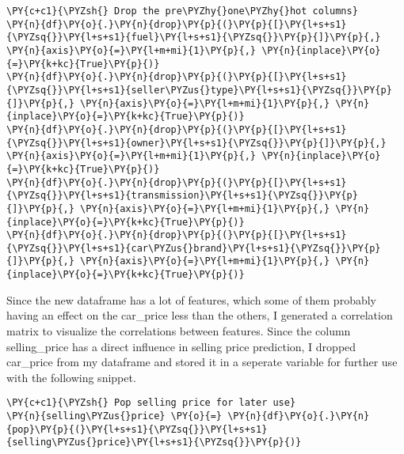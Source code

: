 \begin{tcolorbox}[breakable, size=fbox, boxrule=1pt, pad at break*=1mm,colback=cellbackground, colframe=cellborder]
\begin{Verbatim}[commandchars=\\\{\}]
\PY{c+c1}{\PYZsh{} Drop the pre\PYZhy{}one\PYZhy{}hot columns}
\PY{n}{df}\PY{o}{.}\PY{n}{drop}\PY{p}{(}\PY{p}{[}\PY{l+s+s1}{\PYZsq{}}\PY{l+s+s1}{fuel}\PY{l+s+s1}{\PYZsq{}}\PY{p}{]}\PY{p}{,} \PY{n}{axis}\PY{o}{=}\PY{l+m+mi}{1}\PY{p}{,} \PY{n}{inplace}\PY{o}{=}\PY{k+kc}{True}\PY{p}{)}
\PY{n}{df}\PY{o}{.}\PY{n}{drop}\PY{p}{(}\PY{p}{[}\PY{l+s+s1}{\PYZsq{}}\PY{l+s+s1}{seller\PYZus{}type}\PY{l+s+s1}{\PYZsq{}}\PY{p}{]}\PY{p}{,} \PY{n}{axis}\PY{o}{=}\PY{l+m+mi}{1}\PY{p}{,} \PY{n}{inplace}\PY{o}{=}\PY{k+kc}{True}\PY{p}{)}
\PY{n}{df}\PY{o}{.}\PY{n}{drop}\PY{p}{(}\PY{p}{[}\PY{l+s+s1}{\PYZsq{}}\PY{l+s+s1}{owner}\PY{l+s+s1}{\PYZsq{}}\PY{p}{]}\PY{p}{,} \PY{n}{axis}\PY{o}{=}\PY{l+m+mi}{1}\PY{p}{,} \PY{n}{inplace}\PY{o}{=}\PY{k+kc}{True}\PY{p}{)}
\PY{n}{df}\PY{o}{.}\PY{n}{drop}\PY{p}{(}\PY{p}{[}\PY{l+s+s1}{\PYZsq{}}\PY{l+s+s1}{transmission}\PY{l+s+s1}{\PYZsq{}}\PY{p}{]}\PY{p}{,} \PY{n}{axis}\PY{o}{=}\PY{l+m+mi}{1}\PY{p}{,} \PY{n}{inplace}\PY{o}{=}\PY{k+kc}{True}\PY{p}{)}
\PY{n}{df}\PY{o}{.}\PY{n}{drop}\PY{p}{(}\PY{p}{[}\PY{l+s+s1}{\PYZsq{}}\PY{l+s+s1}{car\PYZus{}brand}\PY{l+s+s1}{\PYZsq{}}\PY{p}{]}\PY{p}{,} \PY{n}{axis}\PY{o}{=}\PY{l+m+mi}{1}\PY{p}{,} \PY{n}{inplace}\PY{o}{=}\PY{k+kc}{True}\PY{p}{)}
\end{Verbatim}
\end{tcolorbox}

Since the new dataframe has a lot of features, which some of them probably
having an effect on the car\_price less than the others, I generated a
correlation matrix to visualize the correlations between features. Since the
column selling\_price has a direct influence in selling price prediction, I
dropped car\_price from my dataframe and stored it in a seperate variable for
further use with the following snippet. 
        
\begin{tcolorbox}[breakable, size=fbox, boxrule=1pt, pad at break*=1mm,colback=cellbackground, colframe=cellborder]
\begin{Verbatim}[commandchars=\\\{\}]
\PY{c+c1}{\PYZsh{} Pop selling price for later use}
\PY{n}{selling\PYZus{}price} \PY{o}{=} \PY{n}{df}\PY{o}{.}\PY{n}{pop}\PY{p}{(}\PY{l+s+s1}{\PYZsq{}}\PY{l+s+s1}{selling\PYZus{}price}\PY{l+s+s1}{\PYZsq{}}\PY{p}{)}
\end{Verbatim}
\end{tcolorbox}
\newpage

